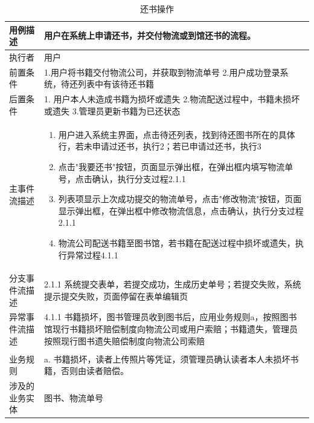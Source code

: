 \begin{table}[hp]
    \centering
    \caption{还书操作}
    \begin{tabular*}{\textwidth}{p{}|p{}}
        \hline
    用例描述    & 用户在系统上申请还书，并交付物流或到馆还书的流程。    \\ \hline
    执行者     & 用户      \\ \hline
    前置条件    & 1.用户将书籍交付物流公司，并获取到物流单号    2.用户成功登录系统，待还列表中有该待还书籍   \\ \hline
    后置条件    & 1. 用户本人未造成书籍为损坏或遗失     2.物流配送过程中，书籍未损坏或遗失  3.管理员更新书籍为已还状态    \\ \hline
    主事件流描述  & \begin{enumerate} 
            \item 用户进入系统主界面，点击待还列表，找到待还图书所在的具体行，若未申请过还书，执行2；若已申请过还书，执行3
            \item 点击"我要还书"按钮，页面显示弹出框，在弹出框内填写物流单号，点击确认，执行分支过程2.1.1
            \item 列表项显示上次成功提交的物流单号，点击"修改物流"按钮，页面显示弹出框，在弹出框中修改物流信息，点击确认，执行分支过程2.1.1
            \item 物流公司配送书籍至图书馆，若书籍在配送过程中损坏或遗失，执行异常过程4.1.1
        \end{enumerate} \\ \hline
    分支事件流描述 & 2.1.1 系统提交表单，若提交成功，生成历史单号；若提交失败，系统提示提交失败，页面停留在表单编辑页    \\ \hline
    异常事件流描述 & 4.1.1 书籍损坏，图书管理员收到图书后，应用业务规则a，按照图书馆现行书籍损坏赔偿制度向物流公司或用户索赔；书籍遗失，管理员按照现行图书遗失赔偿制度向物流公司索赔 \\ \hline                                                                            \\ \hline
    业务规则    &  a. 书籍损坏，读者上传照片等凭证，须管理员确认读者本人未损坏书籍，否则由读者赔偿。 \\ \hline
    涉及的业务实体 & 图书、物流单号    \\ \hline
\end{tabular*}
\end{table}
